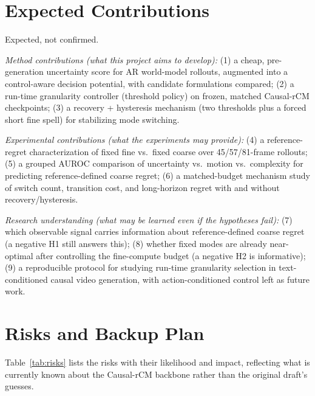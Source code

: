 \documentclass[11pt,a4paper]{article}
\begin{document}
\section{Expected Contributions}\label{sec:contributions}

Expected, not confirmed.

\emph{Method contributions (what this project aims to develop):} (1) a cheap, pre-generation uncertainty score for AR world-model rollouts, augmented into a control-aware decision potential, with candidate formulations compared; (2) a run-time granularity controller (threshold policy) on frozen, matched Causal-rCM checkpoints; (3) a recovery + hysteresis mechanism (two thresholds plus a forced short fine spell) for stabilizing mode switching.

\emph{Experimental contributions (what the experiments may provide):} (4) a reference-regret characterization of fixed fine vs.\ fixed coarse over 45/57/81-frame rollouts; (5) a grouped AUROC comparison of uncertainty vs.\ motion vs.\ complexity for predicting reference-defined coarse regret; (6) a matched-budget mechanism study of switch count, transition cost, and long-horizon regret with and without recovery/hysteresis.

\emph{Research understanding (what may be learned even if the hypotheses fail):} (7) which observable signal carries information about reference-defined coarse regret (a negative H1 still answers this); (8) whether fixed modes are already near-optimal after controlling the fine-compute budget (a negative H2 is informative); (9) a reproducible protocol for studying run-time granularity selection in text-conditioned causal video generation, with action-conditioned control left as future work.

\newpage
\section{Risks and Backup Plan}\label{sec:risks}

Table~\ref{tab:risks} lists the risks with their likelihood and impact, reflecting what is currently known about the Causal-rCM backbone rather than the original draft's guesses.
\end{document}
